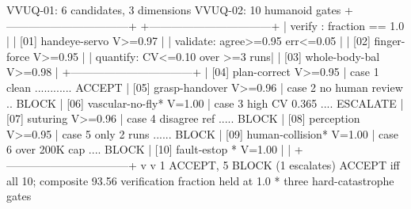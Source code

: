 \begin{asciifig}
VVUQ-01: 6 candidates, 3 dimensions   VVUQ-02: 10 humanoid gates
+---------------------------------+   +---------------------------------+
| verify  : fraction == 1.0       |   | [01] handeye-servo    V>=0.97   |
| validate: agree>=0.95 err<=0.05 |   | [02] finger-force     V>=0.95   |
| quantify: CV<=0.10 over >=3 runs|   | [03] whole-body-bal   V>=0.98   |
+---------------------------------+   | [04] plan-correct     V>=0.95   |
 case 1 clean ............ ACCEPT     | [05] grasp-handover   V>=0.96   |
 case 2 no human review .. BLOCK      | [06] vascular-no-fly* V=1.00    |
 case 3 high CV 0.365 .... ESCALATE   | [07] suturing         V>=0.96   |
 case 4 disagree ref ..... BLOCK      | [08] perception       V>=0.95   |
 case 5 only 2 runs ...... BLOCK      | [09] human-collision* V=1.00    |
 case 6 over 200K cap .... BLOCK      | [10] fault-estop    * V=1.00    |
                 |                    +---------------------------------+
                 v                                      v
 1 ACCEPT, 5 BLOCK (1 escalates)       ACCEPT iff all 10; composite 93.56
 verification fraction held at 1.0     * three hard-catastrophe gates
\end{asciifig}
\vspace{-0.7cm}


